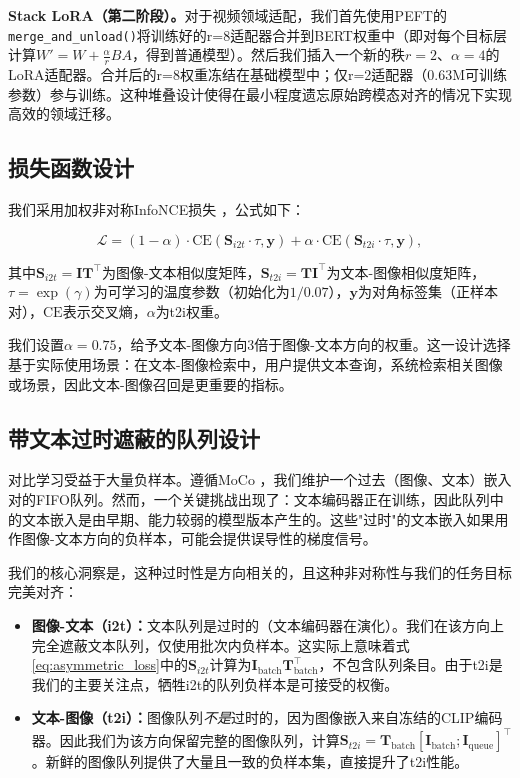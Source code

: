 \documentclass[10pt,a4paper]{ctexart}
\begin{document}
\textbf{Stack LoRA（第二阶段）。}对于视频领域适配，我们首先使用PEFT的\texttt{merge\_and\_unload()}将训练好的r=8适配器合并到BERT权重中（即对每个目标层计算$W' = W + \frac{\alpha}{r}BA$，得到普通模型）。然后我们插入一个新的秩$r=2$、$\alpha=4$的LoRA适配器。合并后的r=8权重冻结在基础模型中；仅r=2适配器（0.63M可训练参数）参与训练。这种堆叠设计使得在最小程度遗忘原始跨模态对齐的情况下实现高效的领域迁移。

\subsection{损失函数设计}

我们采用加权非对称InfoNCE损失 \citep{oord2018representation}，公式如下：

\begin{equation}
\mathcal{L} = (1 - \alpha) \cdot \text{CE}(\mathbf{S}_{i2t} \cdot \tau, \mathbf{y}) + \alpha \cdot \text{CE}(\mathbf{S}_{t2i} \cdot \tau, \mathbf{y}),
\label{eq:asymmetric_loss}
\end{equation}

其中$\mathbf{S}_{i2t} = \mathbf{I} \mathbf{T}^{\top}$为图像-文本相似度矩阵，$\mathbf{S}_{t2i} = \mathbf{T} \mathbf{I}^{\top}$为文本-图像相似度矩阵，$\tau = \exp(\gamma)$为可学习的温度参数（初始化为$1/0.07$），$\mathbf{y}$为对角标签集（正样本对），$\text{CE}$表示交叉熵，$\alpha$为t2i权重。

我们设置$\alpha = 0.75$，给予文本-图像方向3倍于图像-文本方向的权重。这一设计选择基于实际使用场景：在文本-图像检索中，用户提供文本查询，系统检索相关图像或场景，因此文本-图像召回是更重要的指标。

\subsection{带文本过时遮蔽的队列设计}

对比学习受益于大量负样本。遵循MoCo \citep{he2020moco}，我们维护一个过去（图像、文本）嵌入对的FIFO队列。然而，一个关键挑战出现了：文本编码器正在训练，因此队列中的文本嵌入是由早期、能力较弱的模型版本产生的。这些"过时"的文本嵌入如果用作图像-文本方向的负样本，可能会提供误导性的梯度信号。

我们的核心洞察是，这种过时性是方向相关的，且这种非对称性与我们的任务目标完美对齐：

\begin{itemize}
  \item \textbf{图像-文本（i2t）：}文本队列是过时的（文本编码器在演化）。我们在该方向上完全遮蔽文本队列，仅使用批次内负样本。这实际上意味着式\ref{eq:asymmetric_loss}中的$\mathbf{S}_{i2t}$计算为$\mathbf{I}_{\text{batch}} \mathbf{T}_{\text{batch}}^{\top}$，不包含队列条目。由于t2i是我们的主要关注点，牺牲i2t的队列负样本是可接受的权衡。
  \item \textbf{文本-图像（t2i）：}图像队列\emph{不是}过时的，因为图像嵌入来自冻结的CLIP编码器。因此我们为该方向保留完整的图像队列，计算$\mathbf{S}_{t2i} = \mathbf{T}_{\text{batch}} [\mathbf{I}_{\text{batch}}; \mathbf{I}_{\text{queue}}]^{\top}$。新鲜的图像队列提供了大量且一致的负样本集，直接提升了t2i性能。
\end{itemize}
\end{document}
